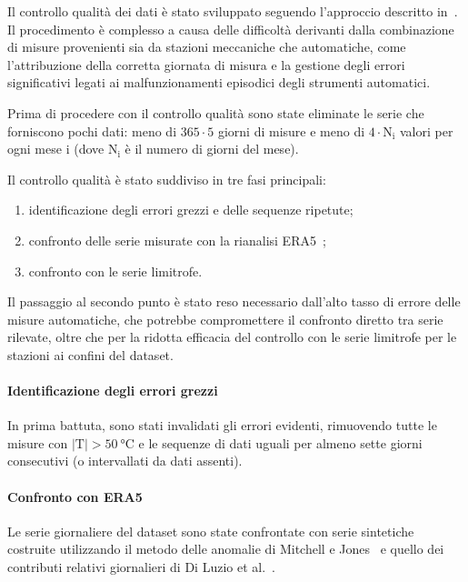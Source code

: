 Il controllo qualità dei dati è stato sviluppato seguendo l'approccio descritto in~\cite{brunettiHighresolutionTemperatureClimatology2014}. Il procedimento è complesso a causa delle difficoltà derivanti dalla combinazione di misure provenienti sia da stazioni meccaniche che automatiche, come l'attribuzione della corretta giornata di misura e la gestione degli errori significativi legati ai malfunzionamenti episodici degli strumenti automatici.

Prima di procedere con il controllo qualità sono state eliminate le serie che forniscono pochi dati: meno di \(365 \cdot 5\) giorni di misure e meno di \(4 \cdot \mathrm{N_i}\) valori per ogni mese \(\mathrm{i}\) (dove \(\mathrm{N_i}\) è il numero di giorni del mese).

Il controllo qualità è stato suddiviso in tre fasi principali:
\begin{enumerate}
  \item identificazione degli errori grezzi e delle sequenze ripetute;
  \item confronto delle serie misurate con la rianalisi ERA5~\cite{hersbachERA5GlobalReanalysis2020};
  \item confronto con le serie limitrofe.
\end{enumerate}

Il passaggio al secondo punto è stato reso necessario dall'alto tasso di errore delle misure automatiche, che potrebbe compromettere il confronto diretto tra serie rilevate, oltre che per la ridotta efficacia del controllo con le serie limitrofe per le stazioni ai confini del dataset.

\paragraph{Identificazione degli errori grezzi}
In prima battuta, sono stati invalidati gli errori evidenti, rimuovendo tutte le misure con \(\lvert \mathrm{T} \rvert > \qty{50}{\degreeCelsius}\) e le sequenze di dati uguali per almeno sette giorni consecutivi (o intervallati da dati assenti).

\paragraph{Confronto con ERA5}
Le serie giornaliere del dataset sono state confrontate con serie sintetiche costruite utilizzando il metodo delle anomalie di Mitchell e Jones~\cite{mitchellImprovedMethodConstructing2005} e quello dei contributi relativi giornalieri di Di Luzio et al.~\cite{diluzioConstructingRetrospectiveGridded2008}.


